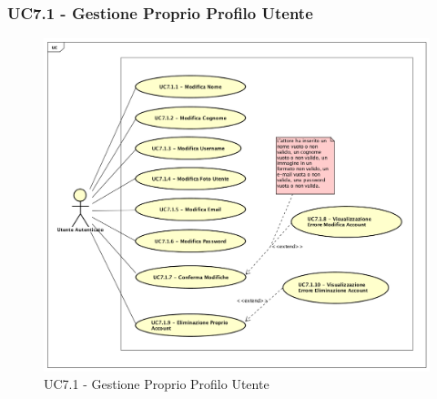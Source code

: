 \newpage
\subsubsection{UC7.1 - Gestione Proprio Profilo Utente}
\label{UC7.1}

\begin{figure}[ht]
	\centering
	\includegraphics[scale=0.45]{UML/UC7_1.png}
	\caption{UC7.1 - Gestione Proprio Profilo Utente}
\end{figure}
\FloatBarrier
